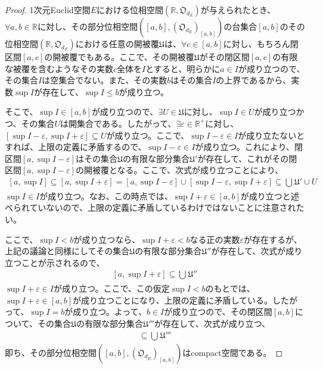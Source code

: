 \documentclass[dvipdfmx]{jsarticle}
\begin{document}
\begin{proof}
1次元Euclid空間$E$における位相空間$\left( \mathbb{R},\mathfrak{O}_{d_{E}} \right)$が与えられたとき、$\forall a,b \in \mathbb{R}$に対し、その部分位相空間$\left( [ a,b],\left( \mathfrak{O}_{d_{E}} \right)_{[ a,b]} \right)$の台集合$[ a,b]$のその位相空間$\left( \mathbb{R},\mathfrak{O}_{d_{E}} \right)$における任意の開被覆$\mathfrak{U}$は、$\forall c \in [ a,b]$に対し、もちろん閉区間$[ a,c]$の開被覆でもある。ここで、その開被覆$\mathfrak{U}$がその閉区間$[ a,c]$の有限な被覆を含むようなその実数$c$全体を$I$とすると、明らかに$a \in I$が成り立つので、その集合$I$は空集合でない。また、その実数$b$はその集合$I$の上界であるから、実数$\sup I$が存在して、$\sup I \leq b$が成り立つ。\par
そこで、$\sup I \in [ a,b]$が成り立つので、$\exists U \in \mathfrak{U}$に対し、$\sup I \in U$が成り立つかつ、その集合$U$は開集合である。したがって、$\exists\varepsilon \in \mathbb{R}^{+}$に対し、$\left[ \sup I - \varepsilon,\sup I + \varepsilon \right] \subseteq U$が成り立つ。ここで、$\sup I - \varepsilon \in I$が成り立たないとすれば、上限の定義に矛盾するので、$\sup I - \varepsilon \in I$が成り立つ。これにより、閉区間$\left[ a,\sup I - \varepsilon \right]$はその集合$\mathfrak{U}$の有限な部分集合$\mathfrak{U}'$が存在して、これがその閉区間$\left[ a,\sup I - \varepsilon \right]$の開被覆となる。ここで、次式が成り立つことにより、
\begin{align*}
\left[ a,\sup I \right] \subseteq \left[ a,\sup I + \varepsilon \right] = \left[ a,\sup I - \varepsilon \right] \cup \left[ \sup I - \varepsilon,\sup I + \varepsilon \right] \subseteq \bigcup_{} \mathfrak{U}' \cup U
\end{align*}
$\sup I \in I$が成り立つ。なお、この時点では、$\sup I + \varepsilon \in [ a,b]$が成り立つと述べられていないので、上限の定義に矛盾しているわけではないことに注意されたい。\par
ここで、$\sup I < b$が成り立つなら、$\sup I + \varepsilon < b$なる正の実数$\varepsilon$が存在するが、上記の議論と同様にしてその集合$\mathfrak{U}$の有限な部分集合$\mathfrak{U}''$が存在して、次式が成り立つことが示されるので、
\begin{align*}
\left[ a,\sup I + \varepsilon \right] \subseteq \bigcup_{} \mathfrak{U}''
\end{align*}
$\sup I + \varepsilon \in I$が成り立つ。ここで、この仮定$\sup I < b$のもとでは、$\sup I + \varepsilon \in [ a,b]$が成り立つことになり、上限の定義に矛盾している。したがって、$\sup I = b$が成り立つ。よって、$b \in I$が成り立つので、その閉区間$[ a,b]$について、その集合$\mathfrak{U}$の有限な部分集合$\mathfrak{U}'''$が存在して、次式が成り立つ、
\begin{align*}
[ a,b] \subseteq \bigcup_{} \mathfrak{U}'''
\end{align*}
即ち、その部分位相空間$\left( [ a,b],\left( \mathfrak{O}_{d_{E}} \right)_{[ a,b]} \right)$はcompact空間である。
\end{proof}
\end{document}
